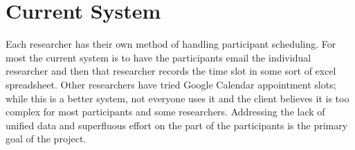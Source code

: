 \section{Current System}
Each researcher has their own method of handling participant scheduling. For most the current system is to have the participants email the individual researcher and then that researcher records the time slot in some sort of excel spreadsheet. Other researchers have tried Google Calendar appointment slots; while this is a better system, not everyone uses it and the client believes it is too complex for most participants and some researchers.  Addressing the lack of unified data and superfluous effort on the part of the participants is the primary goal of the project.